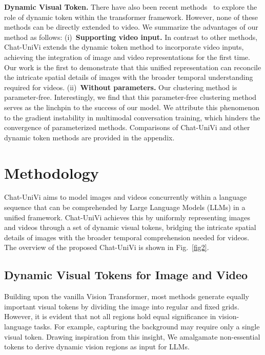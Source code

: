 \documentclass[10pt,twocolumn,letterpaper]{article}
\newcommand{\myparagraph}[1]{\textbf{#1}\hspace{1.8ex}}
\begin{document}
\noindent \myparagraph{Dynamic Visual Token.} 
There have also been recent methods~\cite{ma2023image,xu2022groupvit,zeng2022not,rao2021dynamicvit,bolya2022token} to explore the role of dynamic token within the transformer framework. However, none of these methods can be directly extended to video. We summarize the advantages of our method as follows: (i)~\textbf{Supporting video input.} In contrast to other methods, Chat-UniVi extends the dynamic token method to incorporate video inputs, achieving the integration of image and video representations for the first time. Our work is the first to demonstrate that this unified representation can reconcile the intricate spatial details of images with the broader temporal understanding required for videos. (ii)~\textbf{Without parameters.} Our clustering method is parameter-free. Interestingly, we find that this parameter-free clustering method serves as the linchpin to the success of our model. We attribute this phenomenon to the gradient instability in multimodal conversation training, which hinders the convergence of parameterized methods. Comparisons of Chat-UniVi and other dynamic token methods are provided in the appendix.

\section{Methodology}
Chat-UniVi aims to model images and videos concurrently within a language sequence that can be comprehended by Large Language Models (LLMs) in a unified framework. Chat-UniVi achieves this by uniformly representing images and videos through a set of dynamic visual tokens, bridging the intricate spatial details of images with the broader temporal comprehension needed for videos. The overview of the proposed Chat-UniVi is shown in Fig.~\ref{fig2}.

\subsection{Dynamic Visual Tokens for Image and Video}
Building upon the vanilla Vision Transformer, most methods generate equally important visual tokens by dividing the image into regular and fixed grids. However, it is evident that not all regions hold equal significance in vision-language tasks. For example, capturing the background may require only a single visual token. Drawing inspiration from this insight, We amalgamate non-essential tokens to derive dynamic vision regions as input for LLMs.
\end{document}

